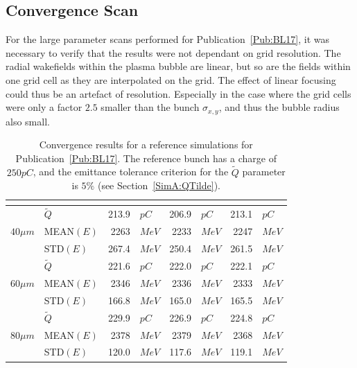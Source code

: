 \subsection{Convergence Scan}
\label{SimA:Converge}

For the large parameter scans performed for Publication~\ref{Pub:BL17}, it was necessary to verify that the results were not dependant on grid resolution.
The radial wakefields within the plasma bubble are linear, but so are the fields within one grid cell as they are interpolated on the grid.
The effect of linear focusing could thus be an artefact of resolution.
Especially in the case where the grid cells were only a factor $2.5$ smaller than the bunch $\sigma_{x,y}$, and thus the bubble radius also small.

\begin{table}[hbt]
    \centering
    \caption{Convergence results for a reference simulations for Publication~\ref{Pub:BL17}.
    The reference bunch has a charge of $250\unit{pC}$, and the emittance tolerance criterion for the $\tilde{Q}$ parameter is $5\%$ (see Section~\ref{SimA:QTilde}).}
    \label{T:Converg}
    \begin{tabularx}{132mm}{Xl d{1}l d{1}l d{1}l}
         & 
            & 
            & 
            &  \\
        \hline
                         & $\tilde{Q}$ &  213.9 & $\unit{pC}$  &  206.9 & $\unit{pC}$  &  213.1 & $\unit{pC}$  \\
        $40\unit{\mu m}$ & MEAN$(E)$   & 2263   & $\unit{MeV}$ & 2233   & $\unit{MeV}$ & 2247   & $\unit{MeV}$ \\
                         & STD$(E)$    &  267.4 & $\unit{MeV}$ &  250.4 & $\unit{MeV}$ &  261.5 & $\unit{MeV}$ \\
        \hline
                         & $\tilde{Q}$ &  221.6 & $\unit{pC}$  &  222.0 & $\unit{pC}$  &  222.1 & $\unit{pC}$  \\
        $60\unit{\mu m}$ & MEAN$(E)$   & 2346   & $\unit{MeV}$ & 2336   & $\unit{MeV}$ & 2333   & $\unit{MeV}$ \\
                         & STD$(E)$    &  166.8 & $\unit{MeV}$ &  165.0 & $\unit{MeV}$ &  165.5 & $\unit{MeV}$ \\
        \hline
                         & $\tilde{Q}$ &  229.9 & $\unit{pC}$  &  226.9 & $\unit{pC}$  &  224.8 & $\unit{pC}$  \\
        $80\unit{\mu m}$ & MEAN$(E)$   & 2378   & $\unit{MeV}$ & 2379   & $\unit{MeV}$ & 2368   & $\unit{MeV}$ \\
                         & STD$(E)$    &  120.0 & $\unit{MeV}$ &  117.6 & $\unit{MeV}$ &  119.1 & $\unit{MeV}$ \\
    \end{tabularx}
\end{table}

